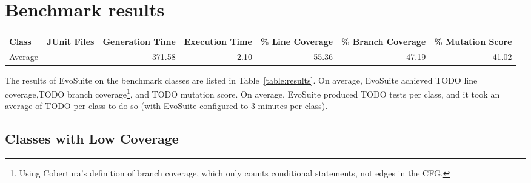 \documentclass[10pt,conference,compsocconf]{IEEEtran}
\newcommand{\EVOSUITE}{{\sc EvoSuite}\xspace}
\begin{document}
\section{Benchmark results}

\begin{table*}[t]
  \centering
  \caption{\label{table:results}Detailed results of \EVOSUITE on the SBST benchmark classes.}
  \scriptsize
  \begin{tabular}{l rrrrrr} \toprule
Class &  JUnit Files &   Generation Time & Execution Time   & \% Line Coverage & \% Branch Coverage & \% Mutation Score \\  
\midrule

\midrule
Average & & 371.58 & 2.10 & 55.36 & 47.19 & 41.02\\
\bottomrule
  \end{tabular}
\end{table*}


The results of \EVOSUITE on the benchmark classes are listed in
Table~\ref{table:results}. On average, \EVOSUITE achieved TODO line
coverage,TODO branch coverage\footnote{Using Cobertura's definition
  of branch coverage, which only counts conditional statements, not
  edges in the CFG.}, and TODO mutation score. On average, \EVOSUITE
produced TODO tests per class, and it took an average of TODO per class to
do so (with \EVOSUITE configured to 3 minutes per class).



\subsection{Classes with Low Coverage}
\end{document}
